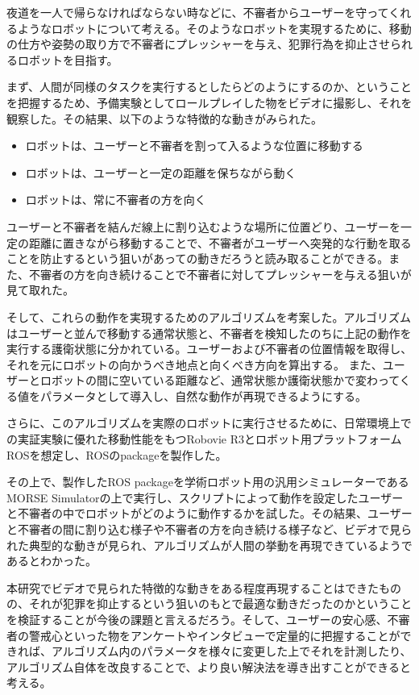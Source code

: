 \documentclass{kuisthesis}
\date{平成31年2月8日}				%
\begin{document}
\maketitle

\begin{jabstract}				%
夜道を一人で帰らなければならない時などに、不審者からユーザーを守ってくれるようなロボットについて考える。そのようなロボットを実現するために、移動の仕方や姿勢の取り方で不審者にプレッシャーを与え、犯罪行為を抑止させられるロボットを目指す。

まず、人間が同様のタスクを実行するとしたらどのようにするのか、ということを把握するため、予備実験としてロールプレイした物をビデオに撮影し、それを観察した。その結果、以下のような特徴的な動きがみられた。

\begin{itemize}
\item ロボットは、ユーザーと不審者を割って入るような位置に移動する
\item ロボットは、ユーザーと一定の距離を保ちながら動く
\item ロボットは、常に不審者の方を向く
\end{itemize}

ユーザーと不審者を結んだ線上に割り込むような場所に位置どり、ユーザーを一定の距離に置きながら移動することで、不審者がユーザーへ突発的な行動を取ることを防止するという狙いがあっての動きだろうと読み取ることができる。また、不審者の方を向き続けることで不審者に対してプレッシャーを与える狙いが見て取れた。

そして、これらの動作を実現するためのアルゴリズムを考案した。アルゴリズムはユーザーと並んで移動する通常状態と、不審者を検知したのちに上記の動作を実行する護衛状態に分かれている。ユーザーおよび不審者の位置情報を取得し、それを元にロボットの向かうべき地点と向くべき方向を算出する。
また、ユーザーとロボットの間に空いている距離など、通常状態か護衛状態かで変わってくる値をパラメータとして導入し、自然な動作が再現できるようにする。

さらに、このアルゴリズムを実際のロボットに実行させるために、日常環境上での実証実験に優れた移動性能をもつRobovie R3とロボット用プラットフォームROSを想定し、ROSのpackageを製作した。

その上で、製作したROS packageを学術ロボット用の汎用シミュレーターであるMORSE Simulatorの上で実行し、スクリプトによって動作を設定したユーザーと不審者の中でロボットがどのように動作するかを試した。その結果、ユーザーと不審者の間に割り込む様子や不審者の方を向き続ける様子など、ビデオで見られた典型的な動きが見られ、アルゴリズムが人間の挙動を再現できているようであるとわかった。

本研究でビデオで見られた特徴的な動きをある程度再現することはできたものの、それが犯罪を抑止するという狙いのもとで最適な動きだったのかということを検証することが今後の課題と言えるだろう。そして、ユーザーの安心感、不審者の警戒心といった物をアンケートやインタビューで定量的に把握することができれば、アルゴリズム内のパラメータを様々に変更した上でそれを計測したり、アルゴリズム自体を改良することで、より良い解決法を導き出すことができると考える。
\end{jabstract}
\end{document}
